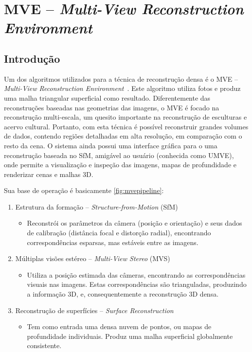 \section{MVE -- \emph{Multi-View Reconstruction Environment}}\label{sec:mve}
%
\subsection*{Introdução}
Um dos algoritmos utilizados para a técnica de reconstrução densa é o MVE -- \emph{Multi-View Reconstruction Environment}~\cite{mve}. Este algoritmo utiliza fotos e produz uma malha triangular superficial como resultado. Diferentemente das reconstruções baseadas nas geometrias das imagens, o MVE é focado na reconstrução multi-escala, um quesito importante na reconstrução de esculturas e acervo cultural. Portanto, com esta técnica é possível reconstruir grandes volumes de dados, contendo regiões detalhadas em alta resolução, em comparação com o resto da cena. O sistema ainda possui uma interface gráfica para o uma reconstrução baseada no SfM, amigável ao usuário (conhecida como UMVE), onde permite a visualização e inspeção das imagens, mapas de profundidade e renderizar cenas e malhas 3D.

Sua base de operação é basicamente \ref{fig:mvepipeline}:

\begin{enumerate}
\item{Estrutura da formação -- \emph{Structure-from-Motion} (SfM)}

\begin{itemize}
\item{
Reconstrói os parâmetros da câmera (posição e orientação) e seus dados de calibração (distância focal e distorção radial),
encontrando correspondências esparsas, mas estáveis entre as imagens.
}
\end{itemize}

\item{Múltiplas visões estéreo -- \emph{Multi-View Stereo} (MVS)}
\begin{itemize}
\item{
Utiliza a posição estimada das câmeras, encontrando as correspondências visuais nas imagens. Estas correspondências são trianguladas, produzindo a informação 3D, e,
consequentemente a reconstrução 3D densa.
} 
\end{itemize}
\item{Reconstrução de superfícies -- \emph{Surface Reconstruction}}
\begin{itemize}
\item{
Tem como entrada uma densa nuvem de pontos, ou mapas de profundidade individuais. Produz uma malha superficial globalmente consistente.
}
\end{itemize}
\end{enumerate}

